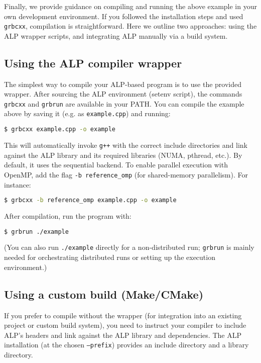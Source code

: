 Finally, we provide guidance on compiling and running the above example in your own development environment. If you followed the installation steps and used \texttt{grbcxx}, compilation is straightforward. Here we outline two approaches: using the ALP wrapper scripts, and integrating ALP manually via a build system.

\subsection*{Using the ALP compiler wrapper}

The simplest way to compile your ALP-based program is to use the provided wrapper. After sourcing the ALP environment (setenv script), the commands \texttt{grbcxx} and \texttt{grbrun} are available in your PATH. You can compile the example above by saving it (e.g. as \texttt{example.cpp}) and running:
\begin{lstlisting}[language=bash]
$ grbcxx example.cpp -o example
\end{lstlisting}
This will automatically invoke \texttt{g++} with the correct include directories and link against the ALP library and its required libraries (NUMA, pthread, etc.). By default, it uses the sequential backend. To enable parallel execution with OpenMP, add the flag \texttt{-b reference\_omp} (for shared-memory parallelism). For instance:


\begin{lstlisting}[language=bash]
$ grbcxx -b reference_omp example.cpp -o example
\end{lstlisting}
After compilation, run the program with:
\begin{lstlisting}[language=bash]
$ grbrun ./example
\end{lstlisting}

(You can also run \texttt{./example} directly for a non-distributed run; \texttt{grbrun} is mainly needed for orchestrating distributed runs or setting up the execution environment.)

\subsection*{Using a custom build (Make/CMake)}

If you prefer to compile without the wrapper (for integration into an existing project or custom build system), you need to instruct your compiler to include ALP's headers and link against the ALP library and dependencies. The ALP installation (at the chosen \texttt{--prefix}) provides an include directory and a library directory.

